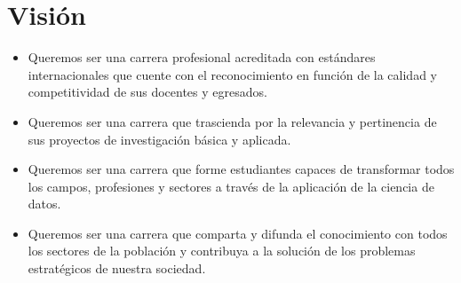 \section{Visión}\label{sec:ds-vision}
\begin{itemize}
\item Queremos ser una carrera profesional acreditada con estándares internacionales que cuente con el reconocimiento en función de la calidad y competitividad de sus docentes y egresados.

\item Queremos ser una carrera que trascienda por la relevancia y pertinencia de sus proyectos de investigación básica y aplicada.

\item Queremos ser una carrera que forme estudiantes capaces de transformar todos los campos, profesiones y sectores a través de la aplicación de la ciencia de datos.

\item Queremos ser una carrera que comparta y difunda el conocimiento con
todos los sectores de la población y contribuya a la solución de los problemas estratégicos de nuestra sociedad.
\end{itemize}
